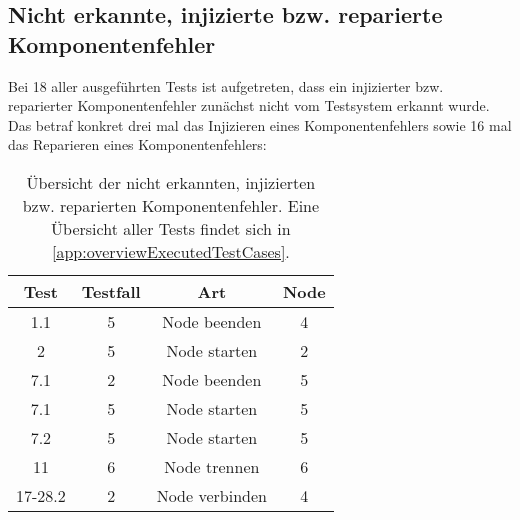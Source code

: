 \subsection{Nicht erkannte, injizierte bzw. reparierte Komponentenfehler}
\label{subsec:notDetectedFaults}

Bei 18 aller ausgeführten Tests ist aufgetreten, dass ein injizierter bzw. reparierter Komponentenfehler zunächst nicht vom Testsystem erkannt wurde.
Das betraf konkret drei mal das Injizieren eines Komponentenfehlers sowie 16 mal das Reparieren eines Komponentenfehlers:

\begin{table}[h]
    \begin{tabular}{c|ccc}
    	 Test   & Testfall &      Art       & Node \\ \hline
    	  1.1   &    5     &  Node beenden  &  4   \\
    	   2    &    5     &  Node starten  &  2   \\
    	  7.1   &    2     &  Node beenden  &  5   \\
    	  7.1   &    5     &  Node starten  &  5   \\
    	  7.2   &    5     &  Node starten  &  5   \\
    	  11    &    6     &  Node trennen  &  6   \\
    	17-28.2 &    2     & Node verbinden &  4
    \end{tabular} 
    \caption[Übersicht der nicht erkannten, injizierten/reparierten Komponentenfehler]
    {Übersicht der nicht erkannten, injizierten bzw. reparierten Komponentenfehler.
    Eine Übersicht aller Tests findet sich in \cref{app:overviewExecutedTestCases}.}
    \label{tab:notDetectedFaults}
\end{table}

